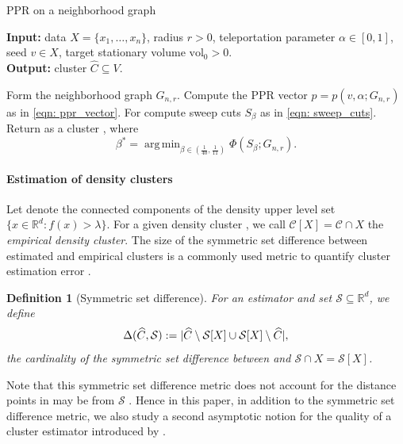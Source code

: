 \documentclass{article}
\DeclarePairedDelimiter\abs{\lvert}{\rvert}
\newcommand{\vol}{\mathrm{vol}}
\newcommand{\Reals}{\mathbb{R}}
\newcommand{\Rd}{\Reals^d}
\newcommand{\1}{\mathbf{1}}
\newcommand{\pbf}{p}        %
\newcommand{\Xbf}{X}             %
\newcommand{\Cbb}{\mathbb{C}}
\newcommand{\Cset}{\mathcal{C}}
\newcommand{\Cest}{\widehat{C}}
\DeclareMathOperator*{\argmin}{arg\,min}
\theoremstyle{aldenthm}
\newtheorem{definition}{Definition}
\theoremstyle{aldenrmrk}
\begin{document}
\begin{algorithm}
\caption{PPR on a neighborhood graph}
\label{alg: ppr}	
{\bfseries Input:} data $\Xbf=\{x_1,\ldots,x_n\}$, radius $r > 0$, teleportation
parameter $\alpha \in [0,1]$, seed $v \in \Xbf$, target stationary volume
$\vol_0 > 0$. \\     
{\bfseries Output:} cluster $\Cest \subseteq V$.
\begin{algorithmic}[1]
  \STATE Form the neighborhood graph $G_{n,r}$.
  \STATE Compute the PPR vector $p=\pbf(v, \alpha; G_{n,r})$ as in \eqref{eqn: 
    ppr_vector}. 
  \STATE For  compute sweep cuts 
  $S_{\beta}$ as in \eqref{eqn: sweep_cuts}.
  \STATE Return as a cluster \smash{$\Cest = S_{\beta^*}$}, where  
  $$
  \beta^* = \argmin_{\beta \in (\frac{1}{40}, \frac{1}{11})} \Phi(S_{\beta}; G_{n,r}).
  $$
\end{algorithmic}
\end{algorithm}

\paragraph{Estimation of density clusters} Let \smash{$\Cbb_f(\lambda)$} denote
the connected components of the density upper level set $\{x \in \Rd: f(x) >
\lambda\}$.  For a given density cluster \smash{$\Cset \in \Cbb_f(\lambda)$}, we
call $\Cset[\Xbf] = \Cset \cap \Xbf$ the \emph{empirical density cluster}. The
size of the symmetric set difference between estimated and empirical clusters is 
a commonly used metric to quantify cluster estimation error
\citep{korostelev1993,polonik1995,rigollet2009}.  

\begin{definition}[Symmetric set difference]
  \label{def: symmetric_set_diff}
  For an estimator \smash{$\Cest \subseteq \Xbf$} and set
  $\mathcal{S} \subseteq \Reals^d$, we define   
  \begin{equation}
    \label{eqn: misclassification_rate}
    \Delta(\Cest, \mathcal{S}) := \abs{\Cest \setminus \mathcal{S}[\Xbf] \cup
      \mathcal{S}[\Xbf] \setminus \Cest},
  \end{equation}
  the cardinality of the symmetric set difference between 
  \smash{$\Cest$} and $\mathcal{S} \cap \Xbf = \mathcal{S}[\Xbf]$. 
\end{definition}

Note that this symmetric set difference metric does not account for the distance
points in \smash{$\Cest \setminus \mathcal{S}[\Xbf]$} may be from
$\mathcal{S}$  \citep{singh2009}. Hence in this paper, in addition to the symmetric
set difference metric, we also study a second asymptotic notion for the quality
of a cluster estimator introduced by \citet{hartigan1981}.  
\end{document}
